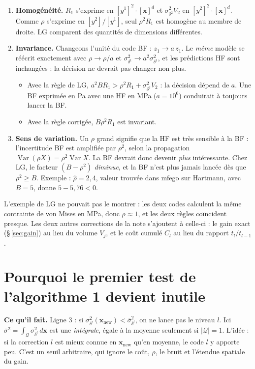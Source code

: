 \documentclass[10pt,a4paper]{article}
\newcommand{\vx}{\bm{x}}
\newcommand{\Q}{\mathcal{Q}}
\DeclareMathOperator{\Var}{Var}
\begin{document}
\begin{aretenir}
\begin{enumerate}
  \item \textbf{Homogénéité.} $R_1$ s'exprime en $[y^1]^2\cdot[\vx]^d$ et $\sigma^2_{\delta^2}V_2$ en
        $[y^2]^2\cdot[\vx]^d$. Comme $\rho$ s'exprime en $[y^2]/[y^1]$, seul $\rho^2R_1$ est homogène au
        membre de droite. LG comparent des quantités de dimensions différentes.
  \item \textbf{Invariance.} Changeons l'unité du code BF : $z_1\to a\,z_1$. Le \emph{même} modèle se
        réécrit exactement avec $\rho\to\rho/a$ et $\sigma^2_{\delta^1}\to a^2\sigma^2_{\delta^1}$, et les
        prédictions HF sont inchangées : la décision ne devrait pas changer non plus.
        \begin{itemize}
          \item Avec la règle de LG, $a^2BR_1>\rho^2R_1+\sigma^2_{\delta^2}V_2$ : la décision dépend de $a$.
                Une BF exprimée en Pa avec une HF en MPa ($a=10^6$) conduirait à toujours lancer la BF.
          \item Avec la règle corrigée, $B\rho^2R_1$ est invariant.
        \end{itemize}
  \item \textbf{Sens de variation.} Un $\rho$ grand signifie que la HF est très sensible à la BF :
        l'incertitude BF est amplifiée par $\rho^2$, selon la propagation $\Var(\rho X)=\rho^2\Var X$. La BF
        devrait donc devenir \emph{plus} intéressante. Chez LG, le facteur $(B-\rho^2)$ \emph{diminue}, et la
        BF n'est plus jamais lancée dès que $\rho^2\ge B$. Exemple : $\hat\rho=2{,}4$, valeur trouvée dans
        mfego sur Hartmann, avec $B=5$, donne $5-5{,}76<0$.
\end{enumerate}
L'exemple de LG ne pouvait pas le montrer : les deux codes calculent la même contrainte de von Mises en
MPa, donc $\rho\approx1$, et les deux règles coïncident presque. Les deux autres corrections de la note
s'ajoutent à celle-ci : le gain exact (§\,\ref{sec:gain}) au lieu du volume $V_j$, et le coût cumulé
$C_l$ au lieu du rapport $t_l/t_{l-1}$.
\end{aretenir}

\section{Pourquoi le premier test de l'algorithme 1 devient inutile}\label{sec:test}
\textbf{Ce qu'il fait.} Ligne 3 : si $\sigma^2_{\delta^l}(\vx_{\mathrm{new}})<\bar\sigma^2_{\delta^l}$, on ne
lance pas le niveau $l$. Ici $\bar\sigma^2=\int_\Q\sigma^2_{\delta^l}\,d\vx$ est une \emph{intégrale}, égale
à la moyenne seulement si $|\Q|=1$. L'idée : si la correction $l$ est mieux connue en $\vx_{\mathrm{new}}$
qu'en moyenne, le code $l$ y apporte peu. C'est un seuil arbitraire, qui ignore le coût, $\rho$, le bruit et
l'étendue spatiale du gain.
\end{document}

